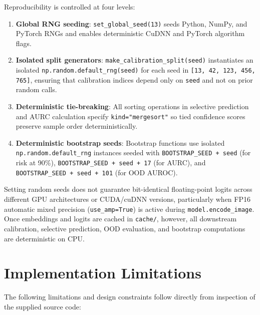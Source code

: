 \documentclass[11pt,a4paper]{article}
\begin{document}
Reproducibility is controlled at four levels:
\begin{enumerate}
  \item \textbf{Global RNG seeding}: \texttt{set\_\allowbreak{}global\_\allowbreak{}seed(\allowbreak{}13)} seeds Python, NumPy, and PyTorch RNGs and enables deterministic CuDNN and PyTorch algorithm flags.
  \item \textbf{Isolated split generators}: \texttt{make\_\allowbreak{}calibration\_\allowbreak{}split(\allowbreak{}seed)} instantiates an isolated \texttt{np.\allowbreak{}random.\allowbreak{}default\_\allowbreak{}rng(\allowbreak{}seed)} for each seed in \texttt{[13,\allowbreak{} 42,\allowbreak{} 123,\allowbreak{} 456,\allowbreak{} 765]}, ensuring that calibration indices depend only on \texttt{seed} and not on prior random calls.
  \item \textbf{Deterministic tie-breaking}: All sorting operations in selective prediction and AURC calculation specify \texttt{kind="mergesort"} so tied confidence scores preserve sample order deterministically.
  \item \textbf{Deterministic bootstrap seeds}: Bootstrap functions use isolated \texttt{np.\allowbreak{}random.\allowbreak{}default\_\allowbreak{}rng} instances seeded with \texttt{BOOTSTRAP\_\allowbreak{}SEED + seed} (for risk at 90\%), \texttt{BOOTSTRAP\_\allowbreak{}SEED + seed + 17} (for AURC), and \texttt{BOOTSTRAP\_\allowbreak{}SEED + seed + 101} (for OOD AUROC).
\end{enumerate}
Setting random seeds does not guarantee bit-identical floating-point logits across different GPU architectures or CUDA/cuDNN versions, particularly when FP16 automatic mixed precision (\texttt{use\_\allowbreak{}amp=True}) is active during \texttt{model.\allowbreak{}encode\_\allowbreak{}image}. Once embeddings and logits are cached in \texttt{cache/\allowbreak{}}, however, all downstream calibration, selective prediction, OOD evaluation, and bootstrap computations are deterministic on CPU.

\section{Implementation Limitations}

The following limitations and design constraints follow directly from inspection of the supplied source code:
\end{document}
